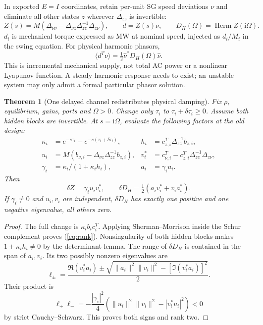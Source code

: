 \documentclass[11pt]{article}
\newtheorem{theorem}{Theorem}
\newcommand{\Herm}{\operatorname{Herm}}
\newcommand{\ii}{\mathrm{i}}
\begin{document}
In exported $E=I$ coordinates, retain per-unit SG speed deviations $\nu$
and eliminate all other states $z$ wherever $\Delta_{zz}$ is invertible:
\begin{equation}
 Z(s)=M(\Delta_{\nu\nu}-\Delta_{\nu z}\Delta_{zz}^{-1}\Delta_{z\nu}),
 \qquad d=Z(s)\nu,\qquad D_H(\Omega)=\Herm Z(\ii\Omega). \label{eq:Z}
\end{equation}
$d_i$ is mechanical torque expressed as MW at nominal speed, injected
as $d_i/M_i$ in the swing equation. For physical harmonic phasors,
\[
 \langle d^T\nu\rangle=\tfrac12\widehat\nu^*D_H(\Omega)\widehat\nu .
\]
This is incremental mechanical supply, not total AC power or a nonlinear
Lyapunov function. A steady harmonic response needs to exist; an unstable
system may only admit a formal particular phasor solution.

\begin{theorem}[One delayed channel redistributes physical damping]
Fix $\rho$, equilibrium, gains, ports and $\Omega>0$.
Change only $\tau_i$ to $\tau_i+\delta\tau_i\geq0$.
Assume both hidden blocks are invertible. At $s=\ii\Omega$, evaluate
the following factors at the old design:
\begin{align*}
 \kappa_i&=e^{-s\tau_i}-e^{-s(\tau_i+\delta\tau_i)},&
 h_i&=c_{z,i}^T\Delta_{zz}^{-1}b_{z,i},\\
 u_i&=M(b_{\nu,i}-\Delta_{\nu z}\Delta_{zz}^{-1}b_{z,i}),&
 v_i^*&=c_{\nu,i}^T-c_{z,i}^T\Delta_{zz}^{-1}\Delta_{z\nu},\\
 \gamma_i&=\kappa_i/(1+\kappa_i h_i),&
 a_i&=\gamma_i u_i .
\end{align*}
Then
\begin{equation}
 \boxed{\delta Z=\gamma_i u_iv_i^*,\qquad
 \delta D_H=\tfrac12(a_iv_i^*+v_ia_i^*).} \label{eq:rank}
\end{equation}
If $\gamma_i\ne0$ and $u_i,v_i$ are independent, $\delta D_H$ has
exactly one positive and one negative eigenvalue, all others zero.
\end{theorem}
\begin{proof}
The full change is $\kappa_i b_ic_i^T$. Applying Sherman--Morrison
inside the Schur complement proves (\ref{eq:rank}). Nonsingularity of
both hidden blocks makes $1+\kappa_i h_i\ne0$ by the determinant lemma.
The range of $\delta D_H$ is contained in the span of $a_i,v_i$.
Its two possibly nonzero eigenvalues are
\[
 \ell_\pm=\frac{\Re(v_i^*a_i)\pm
 \sqrt{\|a_i\|^2\|v_i\|^2-[\Im(v_i^*a_i)]^2}}{2}.
\]
Their product is
\[
 \ell_+\ell_-=-\frac{|\gamma_i|^2}{4}
 \left(\|u_i\|^2\|v_i\|^2-|v_i^*u_i|^2\right)<0
\]
by strict Cauchy--Schwarz. This proves both signs and rank two.
\end{proof}
\end{document}
